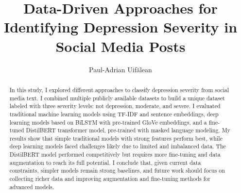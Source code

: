 \documentclass[runningheads]{llncs}
\begin{document}
    \title{Data-Driven Approaches for Identifying Depression Severity in Social Media Posts}

    \author{Paul-Adrian Uif\u{a}lean}

    
    \maketitle 
    
    \begin{abstract}
        In this study, I explored different approaches to classify depression severity from social media text. I combined multiple publicly available datasets to build a unique dataset labeled with three severity levels: not depression, moderate, and severe. I evaluated traditional machine learning models using TF-IDF and sentence embeddings, deep learning models based on BiLSTM with pre-trained GloVe embeddings, and a fine-tuned DistilBERT transformer model, pre-trained with masked language modeling. My results show that simple traditional models with strong features perform best, while deep learning models faced challenges likely due to limited and imbalanced data. The DistilBERT model performed competitively but requires more fine-tuning and data augmentation to reach its full potential. I conclude that, given current data constraints, simpler models remain strong baselines, and future work should focus on collecting richer data and improving augmentation and fine-tuning methods for advanced models.
    \end{abstract}
    

    
    
    
    
    
    
    
    
    
\end{document}
